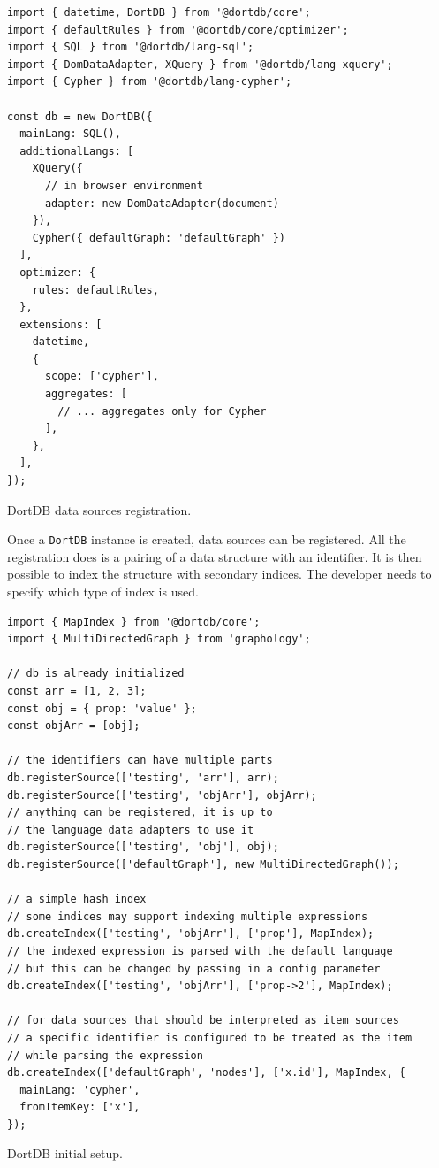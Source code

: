 \begin{listing}[!ht]
\begin{verbatim}
import { datetime, DortDB } from '@dortdb/core';
import { defaultRules } from '@dortdb/core/optimizer';
import { SQL } from '@dortdb/lang-sql';
import { DomDataAdapter, XQuery } from '@dortdb/lang-xquery';
import { Cypher } from '@dortdb/lang-cypher';

const db = new DortDB({
  mainLang: SQL(),
  additionalLangs: [
    XQuery({
      // in browser environment
      adapter: new DomDataAdapter(document)
    }),
    Cypher({ defaultGraph: 'defaultGraph' })
  ],
  optimizer: {
    rules: defaultRules,
  },
  extensions: [
    datetime,
    {
      scope: ['cypher'],
      aggregates: [
        // ... aggregates only for Cypher
      ],
    },
  ],
});
\end{verbatim}
\caption{DortDB data sources registration.}
\end{listing}

Once a \texttt{DortDB} instance is created, data sources can be registered. All the registration does is a pairing of a data structure with an identifier. It is then possible to index the structure with secondary indices. The developer needs to specify which type of index is used.

\begin{listing}[!ht]
\begin{verbatim}
import { MapIndex } from '@dortdb/core';
import { MultiDirectedGraph } from 'graphology';

// db is already initialized
const arr = [1, 2, 3];
const obj = { prop: 'value' };
const objArr = [obj];

// the identifiers can have multiple parts
db.registerSource(['testing', 'arr'], arr);
db.registerSource(['testing', 'objArr'], objArr);
// anything can be registered, it is up to 
// the language data adapters to use it
db.registerSource(['testing', 'obj'], obj);
db.registerSource(['defaultGraph'], new MultiDirectedGraph());

// a simple hash index
// some indices may support indexing multiple expressions
db.createIndex(['testing', 'objArr'], ['prop'], MapIndex);
// the indexed expression is parsed with the default language
// but this can be changed by passing in a config parameter
db.createIndex(['testing', 'objArr'], ['prop->2'], MapIndex);

// for data sources that should be interpreted as item sources
// a specific identifier is configured to be treated as the item
// while parsing the expression
db.createIndex(['defaultGraph', 'nodes'], ['x.id'], MapIndex, {
  mainLang: 'cypher',
  fromItemKey: ['x'],
});
\end{verbatim}
\caption{DortDB initial setup.}
\end{listing}

